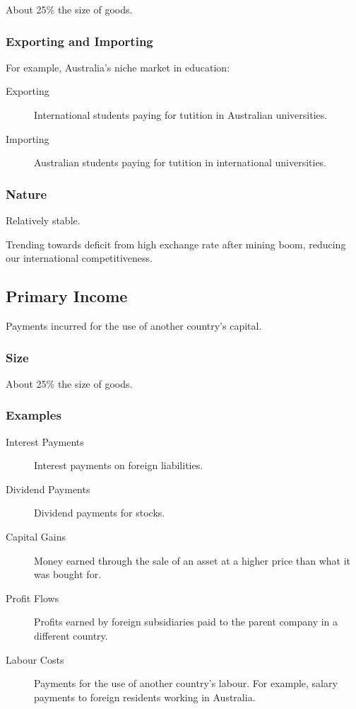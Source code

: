 \documentclass[a4paper,11pt]{article}
\begin{document}
About 25\% the size of goods.


\subsubsection{Exporting and Importing}

For example, Australia's niche market in education:

\begin{description}
\item [Exporting] International students paying for tutition in Australian
	universities.
\item [Importing] Australian students paying for tutition in international
	universities.
\end{description}


\subsubsection{Nature}

Relatively stable.

Trending towards deficit from high exchange rate after mining boom, reducing
our international competitiveness.


\subsection{Primary Income}

Payments incurred for the use of another country's capital.


\subsubsection{Size}

About 25\% the size of goods.


\subsubsection{Examples}

\begin{description}
\item [Interest Payments] Interest payments on foreign liabilities.
\item [Dividend Payments] Dividend payments for stocks.
\item [Capital Gains] Money earned through the sale of an asset at a higher
	price than what it was bought for.
\item [Profit Flows] Profits earned by foreign subsidiaries paid to the parent
	company in a different country.
\item [Labour Costs] Payments for the use of another country's labour. For
	example, salary payments to foreign residents working in Australia.
\end{description}
\end{document}
